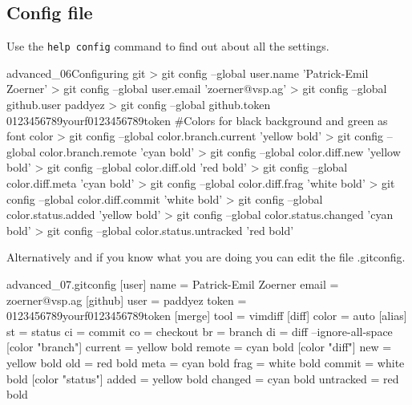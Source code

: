 \subsection{Config file}
Use the \texttt{help config} command to find out about all the settings.
\begin{codelisting}{advanced_06}{Configuring git}
> git config --global user.name 'Patrick-Emil Zoerner'
> git config --global user.email 'zoerner@vsp.ag'
> git config --global github.user paddyez
> git config --global github.token 0123456789yourf0123456789token
#Colors for black background and green as font color
> git config --global color.branch.current 'yellow bold'
> git config --global color.branch.remote 'cyan bold'
> git config --global color.diff.new 'yellow bold'
> git config --global color.diff.old 'red bold'
> git config --global color.diff.meta 'cyan bold'
> git config --global color.diff.frag 'white bold'
> git config --global color.diff.commit 'white bold'
> git config --global color.status.added 'yellow bold'
> git config --global color.status.changed 'cyan bold'
> git config --global color.status.untracked 'red bold'
\end{codelisting}
Alternatively and if you know what you are doing you can edit the file .gitconfig.
\begin{codelisting}{advanced_07}{.gitconfig}
[user]
        name = Patrick-Emil Zoerner
        email = zoerner@vsp.ag
[github]
        user = paddyez
        token = 0123456789yourf0123456789token
[merge]
        tool = vimdiff
[diff]
        color = auto
[alias]
        st = status
        ci = commit
        co = checkout
        br = branch
        di = diff --ignore-all-space
[color "branch"]
        current = yellow bold
        remote = cyan bold
[color "diff"]
        new = yellow bold
        old = red bold
        meta = cyan bold
        frag = white bold
        commit = white bold
[color "status"]
        added = yellow bold
        changed = cyan bold
        untracked = red bold
\end{codelisting}